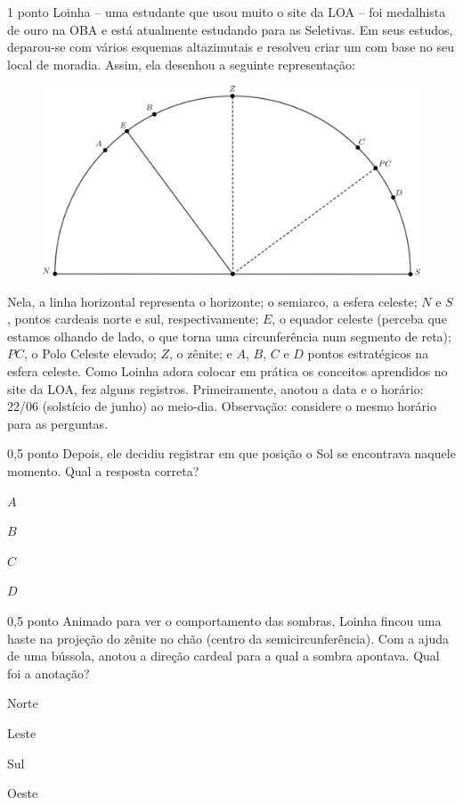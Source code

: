 \documentclass{../lista}
\begin{document}
	\begin{questao}{1 ponto}
		Loinha -- uma estudante que usou muito o site da LOA -- foi medalhista de ouro na OBA e está atualmente estudando para as Seletivas. Em seus estudos, deparou-se com vários esquemas altazimutais e resolveu criar um com base no seu local de moradia. Assim, ela desenhou a seguinte representação:
		\begin{figure}[H]
			\centering
			\includegraphics[scale=1.2]{./img/4.png}
		\end{figure}
		Nela, a linha horizontal representa o horizonte; o semiarco, a esfera celeste; $N$ e $S$, pontos cardeais norte e sul, respectivamente; $E$, o equador celeste (perceba que estamos olhando de lado, o que torna uma circunferência num segmento de reta); $PC$, o Polo Celeste elevado; $Z$, o zênite; e $A$, $B$, $C$ e $D$ pontos estratégicos na esfera celeste. \linebreak
		Como Loinha adora colocar em prática os conceitos aprendidos no site da LOA, fez alguns registros. Primeiramente, anotou a data e o horário: 22/06 (solstício de junho) ao meio-dia.\linebreak
		Observação: considere o mesmo horário para as perguntas.
			\begin{pergunta}{0,5 ponto}
				Depois, ele decidiu registrar em que posição o Sol se encontrava naquele momento. Qual a resposta correta?
				\begin{alternativas}
					\item $A$
					\item $B$
					\item $C$
					\item $D$
				\end{alternativas}
			\end{pergunta}

			\begin{pergunta}{0,5 ponto}
				Animado para ver o comportamento das sombras, Loinha fincou uma haste na projeção do zênite no chão (centro da semicircunferência). Com a ajuda de uma bússola, anotou a direção cardeal para a qual a sombra apontava. Qual foi a anotação?
				\begin{alternativas}
					\item Norte
					\item Leste
					\item Sul
					\item Oeste
				\end{alternativas}
			\end{pergunta}
	\end{questao}
\end{document}
